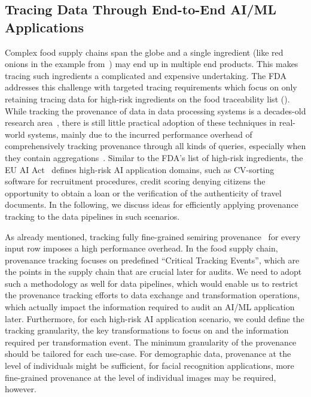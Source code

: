 \subsection{Tracing Data Through End-to-End AI/ML Applications}
\label{sec:vision-tracing}

Complex food supply chains span the globe and a single ingredient (like red onions in the example from~) may end up in multiple end products. This makes tracing such ingredients a complicated and expensive undertaking. The FDA addresses this challenge with targeted tracing requirements which focus on only retaining tracing data for high-risk ingredients on the food traceability list (). While tracking the provenance of data in data processing systems is a decades-old research area~\cite{tan2007provenance}, there is still little practical adoption of these techniques in real-world systems, mainly due to the incurred performance overhead of comprehensively tracking provenance through all kinds of queries, especially when they contain aggregations~\cite{amsterdamer2011provenance}.
%
Similar to the FDA's list of high-risk ingredients, the EU AI Act~\cite{euaiact} defines high-risk AI application domains, such as CV-sorting software for recruitment procedures, credit scoring denying citizens the opportunity to obtain a loan or the verification of the authenticity of travel documents. In the following, we discuss ideas for efficiently applying provenance tracking to the data pipelines in such scenarios.


 As already mentioned, tracking fully fine-grained semiring provenance~\cite{green2007provenance,amsterdamer2011provenance} for every input row imposes a high performance overhead. In the food supply chain, provenance tracking focuses on predefined ``Critical Tracking Events'', which are the points in the supply chain that are crucial later for audits. We need to adopt such a methodology as well for data pipelines, which would enable us to restrict the provenance tracking efforts to data exchange and transformation operations, which actually impact the information required to audit an AI/ML application later. Furthermore, for each high-risk AI application scenario, we could define the tracking granularity, the key transformations to focus on and the information required per transformation event.  The minimum granularity of the provenance should be tailored for each use-case. For demographic data, provenance at the level of individuals might be sufficient, for facial recognition applications, more fine-grained provenance at the level of individual images may be required, however.


